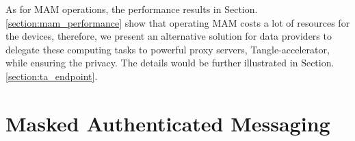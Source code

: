 \begin{spacing}{2.0}
As for MAM operations, the performance results in Section.\ref{section:mam_performance} show that operating MAM costs a lot of resources for the devices, therefore, we present an alternative solution for data providers to delegate these computing tasks to powerful proxy servers, Tangle-accelerator\cite{TA}, while ensuring the privacy. The details would be further illustrated in Section.\ref{section:ta_endpoint}.

\end{spacing}
\clearpage
{}

\newpage
{}
\chapter{Masked Authenticated Messaging}
\pagestyle{plain}

